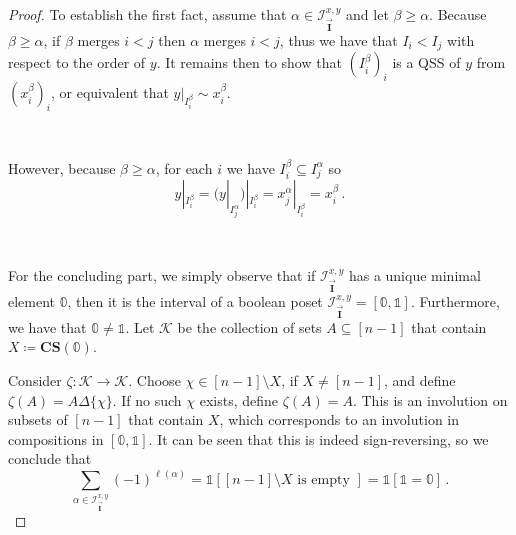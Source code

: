 \documentclass[12pt, reqno]{amsart}
\theoremstyle{definition}
\newcommand{\III}{\vec{\mathbf{I}}}
\begin{document}
\begin{proof}
To establish the first fact, assume that $\alpha \in \mathcal I^{x, y}_{\III}$ and let $\beta \geq \alpha $.
Because $\beta \geq \alpha$, if $\beta $ merges $i < j$ then $\alpha $ merges $i < j$, thus we have that $I_i < I_j$ with respect to the order of $y$.
It remains then to show that $(I^{\beta}_i)_i$ is a QSS of $y$ from $(x^{\beta}_i )_i$, or equivalent that $y|_{I_i^{\beta}} \sim x_i^{\beta}$.

\

However, because $\beta \geq \alpha$, for each $i$ we have $I^{\beta}_i \subseteq I^{\alpha}_j$ so 
\[y|_{I^{\beta}_i} = {\Big(}y|_{I^{\alpha}_j}{\Big )}|_{I^{\beta}_i} =x^{\alpha}_j |_{I^{\beta}_i} = x^{\beta}_i \, .\]

\

For the concluding part, we simply observe that if $\mathcal I^{x, y}_{\III}$ has a unique minimal element $\mathbb{0}$, then it is the interval of a boolean poset $\mathcal I^{x, y}_{\III} = [\mathbb{0}, \mathbb{1}]$.
Furthermore, we have that $\mathbb{0} \neq \mathbb{1}$.
Let $\mathcal K $ be the collection of sets $A \subseteq [n-1]$ that contain $X \coloneqq \mathbf{CS}(\mathbb{0})$.

Consider $\zeta: \mathcal K \to \mathcal K$.
Choose $\chi \in [n-1] \setminus X$, if $X \neq [n-1]$, and define $\zeta (A) = A \Delta \{ \chi \}$.
If no such $\chi $ exists, define $\zeta(A) = A$.
This is an involution on subsets of $[n-1]$ that contain $X$, which corresponds to an involution in compositions in $[\mathbb{0} , \mathbb{1}]$.
It can be seen that this is indeed sign-reversing, so we conclude that 
$$\sum_{\alpha \in \mathcal I^{x, y}_{\III}} (-1)^{\ell(\alpha)} =  \mathbb{1}[[n-1] \setminus X \text{ is empty } ] = \mathbb{1}[\mathbb{1} = \mathbb{0}] \, .$$
\end{proof}


\end{document}
